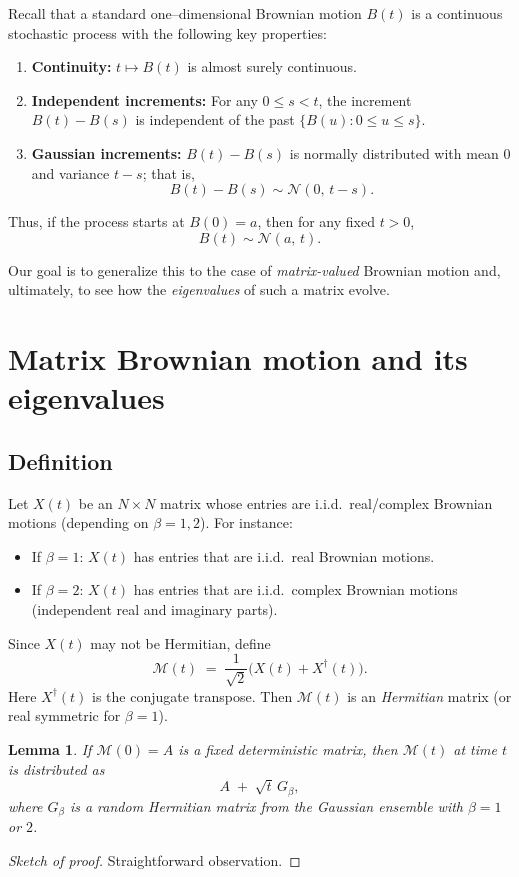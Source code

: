 \documentclass[letterpaper,11pt,oneside,reqno]{article}
\numberwithin{equation}{section}
\newtheorem{lemma}[proposition]{Lemma}
\theoremstyle{definition}
\begin{document}
Recall that a standard one--dimensional Brownian motion \(B(t)\) is a continuous stochastic process with the following key properties:
\begin{enumerate}
    \item \textbf{Continuity:} \(t\mapsto B(t)\) is almost surely continuous.
    \item \textbf{Independent increments:} For any \(0\leq s < t\), the increment \(B(t)-B(s)\) is independent of the past \(\{B(u): 0\le u \le s\}\).
    \item \textbf{Gaussian increments:} \(B(t)-B(s)\) is normally distributed with mean \(0\) and variance \(t-s\); that is,
    \[
    B(t)-B(s) \sim \mathcal{N}(0,\,t-s).
    \]
\end{enumerate}
Thus, if the process starts at \(B(0)=a\), then for any fixed \(t>0\),
\[
B(t)\sim \mathcal{N}(a,\,t).
\]

Our goal is to generalize this to the case of \emph{matrix-valued} Brownian motion and, ultimately, to see how the \emph{eigenvalues} of such a matrix evolve.

\section{Matrix Brownian motion and its eigenvalues}
\label{sec:matrix_BM}

\subsection{Definition}
Let $X(t)$ be an $N\times N$ matrix whose entries are i.i.d.\ real/complex Brownian motions (depending on $\beta=1,2$). For instance:
\begin{itemize}
\item If $\beta=1$: $X(t)$ has entries that are i.i.d.\ real Brownian motions.
\item If $\beta=2$: $X(t)$ has entries that are i.i.d.\ complex Brownian motions (independent real and imaginary parts).
\end{itemize}
Since $X(t)$ may not be Hermitian, define
\[
	\mathcal{M}(t) \;=\; \frac{1}{\sqrt{2}}\bigl(X(t) + X^\dagger(t)\bigr).
\]
Here $X^\dagger(t)$ is the conjugate transpose. Then $\mathcal{M}(t)$ is an \emph{Hermitian} matrix (or real symmetric for $\beta=1$).

\begin{lemma}
\label{lemma:time_fixed_law}
If $\mathcal{M}(0) = A$ is a fixed deterministic matrix, then $\mathcal{M}(t)$ at time $t$ is distributed as
\[
A \;+\;\sqrt{t}\, G_{\beta},
\]
where $G_{\beta}$ is a random Hermitian matrix from the Gaussian ensemble with $\beta=1$ or $2$.
\end{lemma}
\begin{proof}[Sketch of proof]
	Straightforward observation.
\end{proof}
\end{document}
